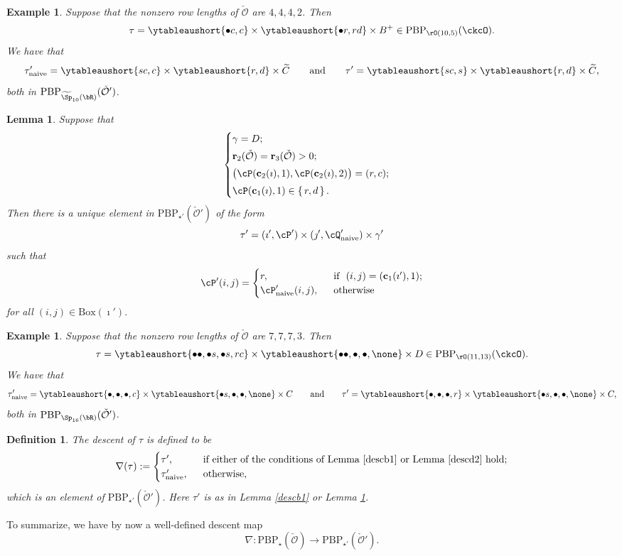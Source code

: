 \documentclass[11pt,a4paper]{amsart}
\newcommand{\CO}{{\mathcal {O}}}
\numberwithin{equation}{section}
\newtheorem{lem}[thm]{Lemma}
\newtheorem{defn}[thm]{Definition}
\newtheorem{eg}[thm]{Example}
\theoremstyle{remark}
\let\ytb=\ytableaushort
\def\BOX{\mathrm{Box}}
\def\PBP{\mathrm{PBP}}
\begin{document}
\begin{eg} Suppose that  the nonzero row lengths of $\check \CO$ are $4,4,4,2$. Then
 \[
 \tau= \ytb{\bullet c, c} \times \ytb{\bullet r, rd}\times
  B^+ \in \PBP_{\rO(10,5)}(\ckcO).
 \]
We have that
\[
 \tau'_{\mathrm{naive}}= \ytb{s c, c} \times \ytb{r, d}\times
  \widetilde C\qquad\textrm{and}\qquad \tau'= \ytb{s c, s} \times \ytb{r, d}\times
  \widetilde C,
 \]
both in $\PBP_{\widetilde \Sp_{10}(\bR)}(\check \CO')$.
\end{eg}


\begin{lem}\label{descd2}
  Suppose that
  \[  \begin{cases}
 \gamma = D; & \smallskip \\
\mathbf r_2(\check \CO)=\mathbf r_3(\check \CO)>0;  &\smallskip\\
\left(\cP(\mathbf c_2(\imath),1), \textrm{\vrule width 0pt  height 0.9em  \relax} \cP(\mathbf c_2(\imath),2)\right)=(r,c); &\smallskip\\
 \cP(\mathbf c_1(\imath),1)\in \set{r,d}.
\end{cases}
\]
 Then there is a unique element in $\mathrm{PBP}_{\star'}(\check \CO')$ of the form
  \[
      \tau'=(\imath', \cP')\times (\jmath', \cQ'_{\mathrm{naive}} )\times \gamma '
  \]
  such that
  \[
\cP'(i,j) = \begin{cases}
  r, & \ \text{ if } \ (i,j) = (\mathbf c_1(\imath'),1); \\
  \cP'_{\mathrm{naive}}(i,j), & \ \text{ otherwise}
\end{cases}
\]
 for all $(i,j)\in \BOX(\imath')$.
\end{lem}


\begin{eg} Suppose that the nonzero row lengths of $\check \CO$ are $7,7,7,3$.
Then
 \[
 \tau= \ytb{\bullet\bullet, \bullet s, \bullet s, r c} \times \ytb{\bullet\bullet,\bullet,\bullet, \none }\times
  D \in \PBP_{\rO(11,13)}(\ckcO).
 \]
We have that
\[
 \tau'_{\mathrm{naive}}=\ytb{\bullet, \bullet , \bullet ,  c} \times \ytb{\bullet s,\bullet,\bullet, \none } \times
  C\qquad\textrm{and}\qquad \tau'=\ytb{\bullet, \bullet , \bullet ,  r} \times \ytb{\bullet s,\bullet,\bullet, \none } \times
  C,
 \]
both in $\PBP_{\Sp_{16}(\bR)}(\check \CO')$.
\end{eg}

\begin{defn}
The descent of $\tau$ is defined to be
\[
  \nabla(\tau):= \begin{cases}
  \tau', & \ \text{ if either of the conditions of Lemma \ref{descb1}  or Lemma \ref{descd2} hold}; \\
  \tau'_\mathrm{naive}, %
  & \ \text{ otherwise},
\end{cases}
\]
which is an element of $  \mathrm{PBP}_{\star'}(\check \CO')$.
Here $\tau'$ is as in Lemma  \ref{descb1} or Lemma \ref{descd2}.
\end{defn}
To summarize, we have by now a well-defined descent map
\begin{equation}\label{def:dspbp}
\nabla: \mathrm{PBP}_{\star}(\check \CO)\rightarrow \mathrm{PBP}_{\star'}(\check \CO').
\end{equation}
\end{document}

